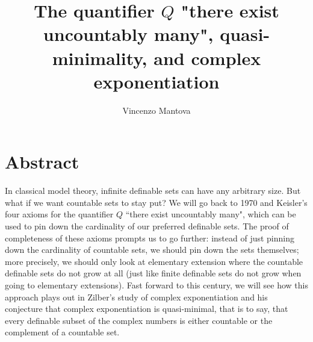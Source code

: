 \documentclass[11pt]{amsart}
\title{The quantifier $Q$ "there exist uncountably many", quasi-minimality, and complex exponentiation}
\author{Vincenzo Mantova}
\begin{document}
\maketitle

\section*{Abstract}

In classical model theory, infinite definable sets can have any arbitrary size. But what if we want countable sets to stay put? We will go back to 1970 and Keisler's four axioms for the quantifier $Q$ ``there exist uncountably many", which can be used to pin down the cardinality of our preferred definable sets. The proof of completeness of these axioms prompts us to go further: instead of just pinning down the cardinality of countable sets, we should pin down the sets themselves; more precisely, we should only look at elementary extension where the countable definable sets do not grow at all (just like finite definable sets do not grow when going to elementary extensions). Fast forward to this century, we will see how this approach plays out in Zilber's study of complex exponentiation and his conjecture that complex exponentiation is quasi-minimal, that is to say, that every definable subset of the complex numbers is either countable or the complement of a countable set.
\end{document}
